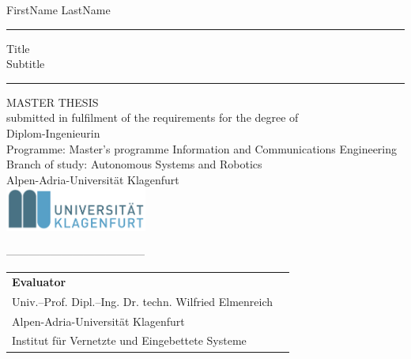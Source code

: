 \begin{titlepage}
\begin{center}

    {\LARGE FirstName LastName\\}
    \vspace{5mm}
    \rule{\textwidth}{1pt}
	{ \LARGE Title  \\
	\vspace*{3mm}Subtitle}
	\vspace*{3mm}
\rule{\textwidth}{1pt}

    \vspace{15mm}
	{\LARGE \sc MASTER THESIS} \\
    \vspace{8mm}
	\normalsize{submitted in fulfilment of the requirements for the degree of}\\
	\vspace{8mm}
	\Large{Diplom-Ingenieurin}\\
	\vspace{8mm}
	\normalsize{Programme: Master’s programme Information and Communications Engineering}\\	\vspace{2mm}
	\normalsize{Branch of study: Autonomous Systems and Robotics}\\
	\vspace{2mm}
     \vspace{8mm}%
	\Large{Alpen-Adria-Universit\"at Klagenfurt}\\
    \vspace{4mm}
    \includegraphics[width=0.35\textwidth]{images/uniklulogo.png}

  \vspace{0.5 mm}%
  -------------------------------------- \\
\end{center}

    \vspace{1mm}
    \enlargethispage{1cm}

\begin{tabular}{ l l }

\textbf{Evaluator}\\
Univ.--Prof. Dipl.--Ing. Dr. techn. Wilfried Elmenreich \\
Alpen-Adria-Universit\"at Klagenfurt \\
Institut f{\"u}r Vernetzte und Eingebettete Systeme \\

\end{tabular}


\vspace{10mm}
\\    

\end{titlepage}

\afterpage{\blankpage}
	
	